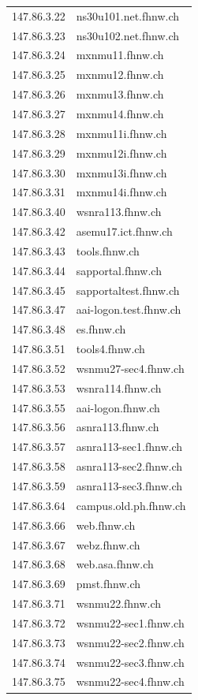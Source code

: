 \documentclass[11pt,a4paper]{scrartcl}
\begin{document}
\begin{longtable}{p{2.5cm}|p{7cm}}
	147.86.3.22 & ns30u101.net.fhnw.ch \\
	147.86.3.23 & ns30u102.net.fhnw.ch \\
	147.86.3.24 & mxnmu11.fhnw.ch \\
	147.86.3.25 & mxnmu12.fhnw.ch \\
	147.86.3.26 & mxnmu13.fhnw.ch \\
	147.86.3.27 & mxnmu14.fhnw.ch \\
	147.86.3.28 & mxnmu11i.fhnw.ch \\
	147.86.3.29 & mxnmu12i.fhnw.ch \\
	147.86.3.30 & mxnmu13i.fhnw.ch \\
	147.86.3.31 & mxnmu14i.fhnw.ch \\
	147.86.3.40 & wsnra113.fhnw.ch \\
	147.86.3.42 & asemu17.ict.fhnw.ch \\
	147.86.3.43 & tools.fhnw.ch \\
	147.86.3.44 & sapportal.fhnw.ch \\
	147.86.3.45 & sapportaltest.fhnw.ch \\
	147.86.3.47 & aai-logon.test.fhnw.ch \\
	147.86.3.48 & es.fhnw.ch \\
	147.86.3.51 & tools4.fhnw.ch \\
	147.86.3.52 & wsnmu27-sec4.fhnw.ch \\
	147.86.3.53 & wsnra114.fhnw.ch \\
	147.86.3.55 & aai-logon.fhnw.ch \\
	147.86.3.56 & asnra113.fhnw.ch \\
	147.86.3.57 & asnra113-sec1.fhnw.ch \\
	147.86.3.58 & asnra113-sec2.fhnw.ch \\
	147.86.3.59 & asnra113-sec3.fhnw.ch \\
	147.86.3.64 & campus.old.ph.fhnw.ch \\
	147.86.3.66 & web.fhnw.ch \\
	147.86.3.67 & webz.fhnw.ch \\
	147.86.3.68 & web.asa.fhnw.ch \\
	147.86.3.69 & pmst.fhnw.ch \\
	147.86.3.71 & wsnmu22.fhnw.ch \\
	147.86.3.72 & wsnmu22-sec1.fhnw.ch \\
	147.86.3.73 & wsnmu22-sec2.fhnw.ch \\
	147.86.3.74 & wsnmu22-sec3.fhnw.ch \\
	147.86.3.75 & wsnmu22-sec4.fhnw.ch \\

\end{longtable}
\end{document}
